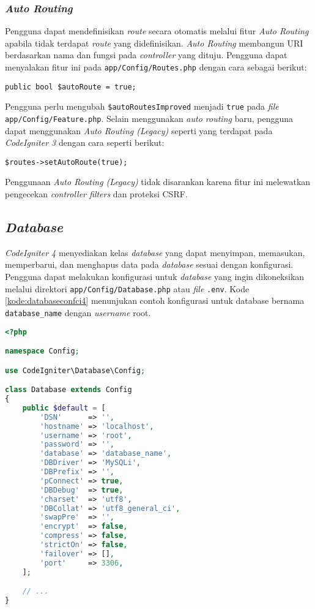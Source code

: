 \subsubsection{\textit{Auto Routing}}
\label{subsubsec:autorouting}
Pengguna dapat mendefinisikan \textit{route} secara otomatis melalui fitur \textit{Auto Routing} apabila tidak terdapat \textit{route} yang didefinisikan. \textit{Auto Routing} membangun URI berdasarkan nama dan fungsi pada \textit{controller} yang dituju. Pengguna dapat menyalakan fitur ini pada \texttt{app/Config/Routes.php} dengan cara sebagai berikut:
\begin{center}
	\verb|public bool $autoRoute = true;|
\end{center}
Pengguna perlu mengubah \verb|$autoRoutesImproved| menjadi \verb|true| pada \textit{file} \verb|app/Config/Feature.php|. Selain menggunakan \textit{auto routing} baru, pengguna dapat menggunakan \textit{Auto Routing (Legacy)} seperti yang terdapat pada \textit{CodeIgniter 3} dengan cara seperti berikut:
\begin{center}
\verb|$routes->setAutoRoute(true);|
\end{center}
Penggunaan \textit{Auto Routing (Legacy)} tidak disarankan karena fitur ini melewatkan pengecekan \textit{controller filters} dan proteksi CSRF.

\subsection{\textit{Database}}
\textit{CodeIgniter 4} menyediakan kelas \textit{database} yang dapat menyimpan, memasukan, memperbarui, dan menghapus data pada \textit{database} sesuai dengan konfigurasi. Pengguna dapat melakukan konfigurasi untuk \textit{database} yang ingin dikoneksikan melalui direktori \verb|app/Config/Database.php| atau \textit{file} \verb|.env|. Kode \ref{kode:databaseconfci4} menunjukan contoh konfigurasi untuk database bernama \verb|database_name| dengan \textit{username} root.

\begin{lstlisting}[language=PHP, caption=Contoh konfigurasi \textit{database} pada \textit{CodeIgniter 4}. ,label=kode:databaseconfci4]
<?php

namespace Config;

use CodeIgniter\Database\Config;

class Database extends Config
{
    public $default = [
        'DSN'      => '',
        'hostname' => 'localhost',
        'username' => 'root',
        'password' => '',
        'database' => 'database_name',
        'DBDriver' => 'MySQLi',
        'DBPrefix' => '',
        'pConnect' => true,
        'DBDebug'  => true,
        'charset'  => 'utf8',
        'DBCollat' => 'utf8_general_ci',
        'swapPre'  => '',
        'encrypt'  => false,
        'compress' => false,
        'strictOn' => false,
        'failover' => [],
        'port'     => 3306,
    ];

    // ...
}
\end{lstlisting}

